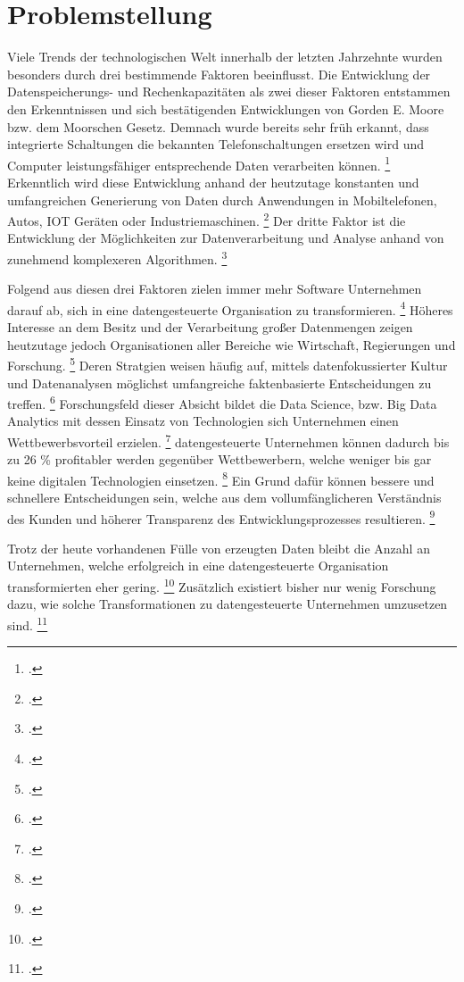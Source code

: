 \chapter[Problemstellung]{Problemstellung}

Viele Trends der technologischen Welt innerhalb der letzten Jahrzehnte wurden besonders durch drei bestimmende Faktoren beeinflusst.
Die Entwicklung der Datenspeicherungs- und Rechenkapazitäten als zwei dieser Faktoren entstammen den Erkenntnissen und sich bestätigenden Entwicklungen von Gorden E. Moore bzw. dem Moorschen Gesetz. \parencite[Vgl.][S. 1]{Moore.1998} %
Demnach wurde bereits sehr früh erkannt, dass integrierte Schaltungen die bekannten Telefonschaltungen ersetzen wird und Computer leistungsfähiger entsprechende Daten verarbeiten können. \footcite[Vgl.][S. 1]{Moore.1998}
Erkenntlich wird diese Entwicklung anhand der heutzutage konstanten und umfangreichen Generierung von Daten durch Anwendungen in Mobiltelefonen, Autos, IOT Geräten oder Industriemaschinen. \footcite[Vgl.][S 3f.]{Dalpiaz.2020}
Der dritte Faktor ist die Entwicklung der Möglichkeiten zur Datenverarbeitung und Analyse anhand von zunehmend komplexeren Algorithmen. \footcite[Vgl.][S. 4]{Dalpiaz.2020}

Folgend aus diesen drei Faktoren zielen immer mehr Software Unternehmen darauf ab, sich in eine datengesteuerte Organisation zu transformieren. \footcite[Vgl.][S. 1]{Fabijan.2017}
Höheres Interesse an dem Besitz und der Verarbeitung großer Datenmengen zeigen heutzutage jedoch Organisationen aller Bereiche wie Wirtschaft, Regierungen und Forschung. \footcite[Vgl.][S. 1]{Pratt.2023}
Deren Stratgien weisen häufig auf, mittels datenfokussierter Kultur und Datenanalysen möglichst umfangreiche faktenbasierte Entscheidungen zu treffen. \footcite[Vgl.][S. 18]{Dalpiaz.2020}
Forschungsfeld dieser Absicht bildet die Data Science, bzw. Big Data Analytics mit dessen Einsatz von Technologien sich Unternehmen einen Wettbewerbsvorteil erzielen. \footcite[Vgl.][S. 3]{Dalpiaz.2020}
datengesteuerte Unternehmen können dadurch bis zu 26 \% profitabler werden gegenüber Wettbewerbern, welche weniger bis gar keine digitalen Technologien einsetzen. \footcite[Vgl.][S. 1]{Fabijan.2017}
Ein Grund dafür können bessere und schnellere Entscheidungen sein, welche aus dem vollumfänglicheren Verständnis des Kunden und höherer Transparenz des Entwicklungsprozesses resultieren. \footcite[Vgl.][S. 18]{Dalpiaz.2020}

Trotz der heute vorhandenen Fülle von erzeugten Daten bleibt die Anzahl an Unternehmen, welche erfolgreich in eine datengesteuerte Organisation transformierten eher gering. \footcite[Vgl.][S. 1]{Fabijan.2017}
Zusätzlich existiert bisher nur wenig Forschung dazu, wie solche Transformationen zu datengesteuerte Unternehmen umzusetzen sind. \footcite[Vgl.][S. 1]{Fabijan.2017}

